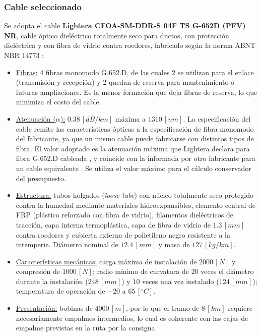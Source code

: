 \subsubsection{Cable seleccionado}
\label{sec_2.2.2}
Se adopta el cable \textbf{Lightera CFOA-SM-DDR-S 04F TS G-652D (PFV) NR}, cable óptico dieléctrico totalmente seco para ductos, con protección dieléctrica y con fibra de vidrio contra roedores, fabricado según la norma ABNT NBR 14773 \cite{b2}:
\begin{itemize}
    \item \underline{Fibras:} 4 fibras monomodo G.652.D, de las cuales 2 se utilizan para el enlace (transmisión y recepción) y 2 quedan de reserva para mantenimiento o futuras ampliaciones. Es la menor formación que deja fibras de reserva, lo que minimiza el costo del cable.
    \item \underline{Atenuación ($\alpha$):} $0.38 \, [dB/km]$ máxima a $1310 \, [nm]$. La especificación del cable remite las características ópticas a la especificación de fibra monomodo del fabricante, ya que un mismo cable puede fabricarse con distintos tipos de fibra. El valor adoptado es la atenuación máxima que Lightera declara para fibra G.652.D cableada \cite{b3}, y coincide con la informada por otro fabricante para un cable equivalente \cite{b19}. Se utiliza el valor máximo para el cálculo conservador del presupuesto.
    \item \underline{Estructura:} tubos holgados (\textit{loose tube}) con núcleo totalmente seco protegido contra la humedad mediante materiales hidroexpansibles, elemento central de FRP (plástico reforzado con fibra de vidrio), filamentos dieléctricos de tracción, capa interna termoplástica, capa de fibra de vidrio de $1.3 \, [mm]$ contra roedores y cubierta externa de polietileno negro resistente a la intemperie. Diámetro nominal de $12.4 \, [mm]$ y masa de $127 \, [kg/km]$.
    \item \underline{Características mecánicas:} carga máxima de instalación de $2000 \, [N]$ y compresión de $1000 \, [N]$; radio mínimo de curvatura de $20$ veces el diámetro durante la instalación ($248 \, [mm]$) y $10$ veces una vez instalado ($124 \, [mm]$); temperatura de operación de $-20$ a $65 \, [^\circ C]$.
    \item \underline{Presentación:} bobinas de $4000 \, [m]$, por lo que el tramo de $8 \, [km]$ requiere necesariamente empalmes intermedios, lo cual es coherente con las cajas de empalme previstas en la ruta por la consigna.
\end{itemize}

